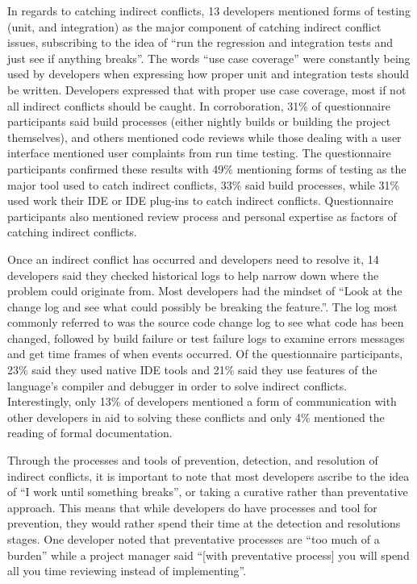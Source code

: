 In regards to catching indirect conflicts, 13 developers mentioned forms of testing (unit, and integration)
as the major component of catching indirect conflict issues, subscribing to the idea of ``run the regression and integration
tests and just see if anything breaks''. The words ``use case coverage'' were constantly being used by developers
when expressing how proper unit and integration tests should be written. Developers expressed that with proper use case coverage, most if
not all indirect conflicts should be caught. In corroboration, 31\% of questionnaire participants said build processes (either nightly builds or building the project
themselves), and others mentioned code reviews while those dealing with a user interface mentioned user complaints from run
time testing. The questionnaire participants confirmed these results with 49\% mentioning forms of testing as the major tool used to
catch indirect conflicts, 33\% said build processes, while 31\% used work their IDE or IDE plug-ins to catch indirect conflicts.
Questionnaire participants also mentioned review process and personal expertise as factors of catching indirect conflicts.

Once an indirect conflict has occurred and developers need to resolve it, 14 developers said
they checked historical logs to help narrow down where the problem could originate from. Most developers had the mindset of
``Look at the change log and see what could possibly be breaking the feature.''. The log most commonly referred to was the source
code change log to see what code has been changed, followed by build failure or test failure logs to examine errors messages and get time
frames of when events occurred. Of the questionnaire participants, 23\% said they used native IDE tools and 21\% said they use
features of the language's compiler and debugger in order to solve indirect conflicts. Interestingly, only 13\% of developers
mentioned a form of communication with other developers in aid to solving these conflicts and only 4\% mentioned the reading
of formal documentation.

Through the processes and tools of prevention, detection, and resolution of indirect conflicts, it is important to note that
most developers ascribe to the idea of ``I work until something breaks'', or taking a curative rather than preventative
approach. This means that while developers do have processes and tool for prevention, they would rather spend their time
at the detection and resolutions stages. One developer noted that preventative processes are ``too much of a burden''
while a project manager said ``[with preventative process] you will spend all you time reviewing instead of implementing''.

